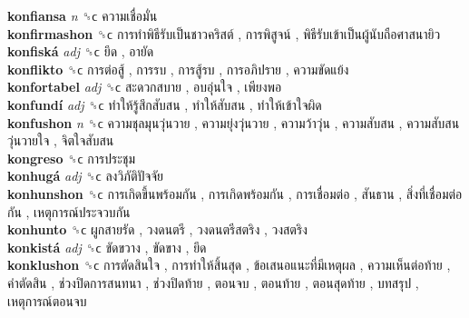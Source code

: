 \textbf{konfiansa} \emph{n}  ␝ϲ   ความเชื่อมั่น   \\
\textbf{konfirmashon} ␝ϲ   การทำพิธีรับเป็นชาวคริสต์ ,  การพิสูจน์ ,  พิธีรับเข้าเป็นผู้นับถือศาสนายิว   \\
\textbf{konfiská} \emph{adj}  ␝ϲ   ยึด ,  อายัด   \\
\textbf{konflikto} ␝ϲ   การต่อสู้ ,  การรบ ,  การสู้รบ ,  การอภิปราย ,  ความขัดแย้ง   \\
\textbf{konfortabel} \emph{adj}  ␝ϲ   สะดวกสบาย ,  อบอุ่นใจ ,  เพียงพอ   \\
\textbf{konfundí} \emph{adj}  ␝ϲ   ทำให้รู้สึกสับสน ,  ทำให้สับสน ,  ทำให้เข้าใจผิด   \\
\textbf{konfushon} \emph{n}  ␝ϲ   ความชุลมุนวุ่นวาย ,  ความยุ่งวุ่นวาย ,  ความว้าวุ่น ,  ความสับสน ,  ความสับสนวุ่นวายใจ ,  จิตใจสับสน   \\
\textbf{kongreso} ␝ϲ   การประชุม   \\
\textbf{konhugá} \emph{adj}  ␝ϲ   ลงวิภัติปัจจัย   \\
\textbf{konhunshon} ␝ϲ   การเกิดขึ้นพร้อมกัน ,  การเกิดพร้อมกัน ,  การเชื่อมต่อ ,  สันธาน ,  สิ่งที่เชื่อมต่อกัน ,  เหตุการณ์ประจวบกัน   \\
\textbf{konhunto} ␝ϲ   ผูกสายรัด ,  วงดนตรี ,  วงดนตรีสตริง ,  วงสตริง   \\
\textbf{konkistá} \emph{adj}  ␝ϲ   ขัดขวาง ,  ขัดขาง ,  ยึด   \\
\textbf{konklushon} ␝ϲ   การตัดสินใจ ,  การทำให้สิ้นสุด ,  ข้อเสนอแนะที่มีเหตุผล ,  ความเห็นต่อท้าย ,  คำตัดสิน ,  ช่วงปิดการสนทนา ,  ช่วงปิดท้าย ,  ตอนจบ ,  ตอนท้าย ,  ตอนสุดท้าย ,  บทสรุป ,  เหตุการณ์ตอนจบ   \\
